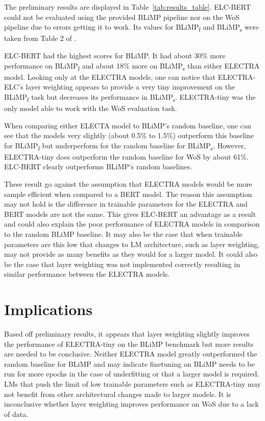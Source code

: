 \documentclass[11pt]{article}
\begin{document}
The preliminary results are displayed in Table~\ref{tab:results_table}. 
ELC-BERT could not be evaluated using the provided BLiMP pipeline nor on the WoS pipeline
due to errors getting it to work. 
Its values for BLiMP\textsubscript{f} and BLiMP\textsubscript{s} 
were taken from Table 2 of \citet{charpentier2023layersequallyimportantlayer}.

ELC-BERT had the highest scores for BLiMP. It had about 
30\% more performance on BLiMP\textsubscript{f} and about 18\% more on
BLiMP\textsubscript{s} than either ELECTRA model. 
Looking only at the ELECTRA models, one can notice that
ELECTRA-ELC's layer weighting appears to provide a very tiny improvement on the 
BLiMP\textsubscript{f} task but decreases its performance in 
BLiMP\textsubscript{s}. ELECTRA-tiny was the only model able to work with the 
WoS evaluation task.

When comparing either ELECTA model to BLiMP's random baseline, one can see that the
models very slightly (about 0.5\% to 1.5\%) outperform this baseline for BLiMP\textsubscript{f} but underperform for the random baseline for
BLiMP\textsubscript{s}. However, ELECTRA-tiny does outperform the random
baseline for WoS by about 61\%. ELC-BERT clearly outperforms BLiMP's random baselines.

These result go against the assumption that ELECTRA models would be more sample efficient
when compared to a BERT model. The reason this assumption may not hold is the difference in
trainable parameters for the ELECTRA and BERT models are not the same. This gives ELC-BERT an advantage as a result and could also explain the poor performance of ELECTRA models in 
comparison to the random BLiMP baseline. It may also be the case that when trainable 
parameters are this low that changes to LM architecture, such as layer weighting, may not
provide as many benefits as they would for a larger model. It could also be the case that
layer weighting was not implemented correctly resulting in similar performance between the
ELECTRA models. 


\section{Implications}

Based off preliminary results, it appears that layer weighting slightly improves the performance
of ELECTRA-tiny on the BLiMP benchmark but more results are needed to be conclusive. 
Neither ELECTRA model greatly
outperformed the random baseline for BLiMP and may indicate finetuning on BLiMP needs to be run for more epochs in the case of underfitting or that a larger model is required. LMs that push the limit of low trainable parameters such as ELECTRA-tiny may
not benefit from other architectural changes made to larger models. It is inconclusive whether layer weighting improves performance on WoS due to a lack
of data.
\end{document}
